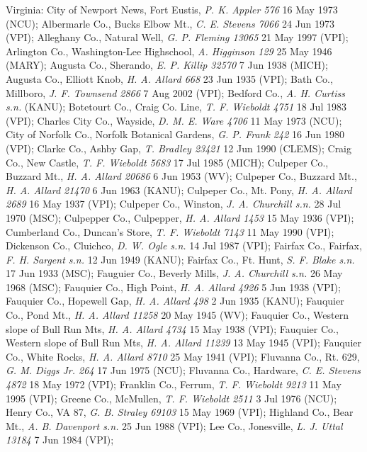 \documentclass{article}
\begin{document}
Virginia:
City of Newport News, Fort Eustis, \textit{P. K. Appler 576} 16 May 1973 (NCU);
Albermarle Co., Bucks Elbow Mt., \textit{C. E. Stevens 7066} 24 Jun 1973 (VPI);
Alleghany Co., Natural Well, \textit{G. P. Fleming 13065} 21 May 1997 (VPI);
Arlington Co., Washington-Lee Highschool, \textit{A. Higginson 129} 25 May 1946 (MARY);
Augusta Co., Sherando, \textit{E. P. Killip 32570} 7 Jun 1938 (MICH);
Augusta Co., Elliott Knob, \textit{H. A. Allard 668} 23 Jun 1935 (VPI);
Bath Co., Millboro, \textit{J. F. Townsend 2866} 7 Aug 2002 (VPI);
Bedford Co., \textit{A. H. Curtiss s.n.} (KANU);
Botetourt Co., Craig Co. Line, \textit{T. F. Wieboldt 4751} 18 Jul 1983 (VPI);
Charles City Co., Wayside, \textit{D. M. E. Ware 4706} 11 May 1973 (NCU);
City of Norfolk Co., Norfolk Botanical Gardens, \textit{G. P. Frank 242} 16 Jun 1980 (VPI);
Clarke Co., Ashby Gap, \textit{T. Bradley 23421} 12 Jun 1990 (CLEMS);
Craig Co., New Castle, \textit{T. F. Wieboldt 5683} 17 Jul 1985 (MICH);
Culpeper Co., Buzzard Mt., \textit{H. A. Allard 20686} 6 Jun 1953 (WV);
Culpeper Co., Buzzard Mt., \textit{H. A. Allard 21470} 6 Jun 1963 (KANU);
Culpeper Co., Mt. Pony, \textit{H. A. Allard 2689} 16 May 1937 (VPI);
Culpeper Co., Winston, \textit{J. A. Churchill s.n.} 28 Jul 1970 (MSC);
Culpepper Co., Culpepper, \textit{H. A. Allard 1453} 15 May 1936 (VPI);
Cumberland Co., Duncan's Store, \textit{T. F. Wieboldt 7143} 11 May 1990 (VPI);
Dickenson Co., Cluichco, \textit{D. W. Ogle s.n.} 14 Jul 1987 (VPI);
Fairfax Co., Fairfax, \textit{F. H. Sargent s.n.} 12 Jun 1949 (KANU);
Fairfax Co., Ft. Hunt, \textit{S. F. Blake s.n.} 17 Jun 1933 (MSC);
Fauguier Co., Beverly Mills, \textit{J. A. Churchill s.n.} 26 May 1968 (MSC);
Fauquier Co., High Point, \textit{H. A. Allard 4926} 5 Jun 1938 (VPI);
Fauquier Co., Hopewell Gap, \textit{H. A. Allard 498} 2 Jun 1935 (KANU);
Fauquier Co., Pond Mt., \textit{H. A. Allard 11258} 20 May 1945 (WV);
Fauquier Co., Western slope of Bull Run Mts, \textit{H. A. Allard 4734} 15 May 1938 (VPI);
Fauquier Co., Western slope of Bull Run Mts, \textit{H. A. Allard 11239} 13 May 1945 (VPI);
Fauquier Co., White Rocks, \textit{H. A. Allard 8710} 25 May 1941 (VPI);
Fluvanna Co., Rt. 629, \textit{G. M. Diggs Jr. 264} 17 Jun 1975 (NCU);
Fluvanna Co., Hardware, \textit{C. E. Stevens 4872} 18 May 1972 (VPI);
Franklin Co., Ferrum, \textit{T. F. Wieboldt 9213} 11 May 1995 (VPI);
Greene Co., McMullen, \textit{T. F. Wieboldt 2511} 3 Jul 1976 (NCU);
Henry Co., VA 87, \textit{G. B. Straley 69103} 15 May 1969 (VPI);
Highland Co., Bear Mt., \textit{A. B. Davenport s.n.} 25 Jun 1988 (VPI);
Lee Co., Jonesville, \textit{L. J. Uttal 13184} 7 Jun 1984 (VPI);
\end{document}
